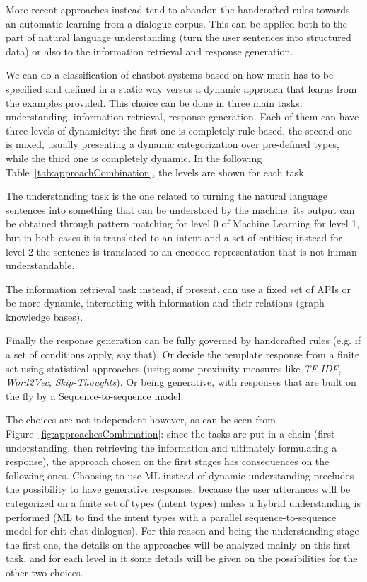 More recent approaches instead tend to abandon the handcrafted rules towards an automatic learning from a dialogue corpus. This can be applied both to the part of natural language understanding (turn the user sentences into structured data) or also to the information retrieval and response generation.

We can do a classification of chatbot systems based on how much has to be specified and defined in a static way versus a dynamic approach that learns from the examples provided. This choice can be done in three main tasks: understanding, information retrieval, response generation. Each of them can have three levels of dynamicity: the first one is completely rule-based, the second one is mixed, usually presenting a dynamic categorization over pre-defined types, while the third one is completely dynamic. In the following Table~\ref{tab:approachCombination}, the levels are shown for each task.



The understanding task is the one related to turning the natural language sentences into something that can be understood by the machine: its output can be obtained through pattern matching for level 0 of Machine Learning for level 1, but in both cases it is translated to an intent and a set of entities; instead for level 2 the sentence is translated to an encoded representation that is not human-understandable. 

The information retrieval task instead, if present, can use a fixed set of APIs or be more dynamic, interacting with information and their relations (graph knowledge bases).

Finally the response generation can be fully governed by handcrafted rules (e.g. if a set of conditions apply, say that). Or decide the template response from a finite set using statistical approaches (using some proximity measures like \textit{TF-IDF}, \textit{Word2Vec}, \textit{Skip-Thoughts}). Or being generative, with responses that are built on the fly by a Sequence-to-sequence model.

The choices are not independent however, as can be seen from Figure~\ref{fig:approachesCombination}: since the tasks are put in a chain (first understanding, then retrieving the information and ultimately formulating a response), the approach chosen on the first stages has consequences on the following ones. Choosing to use ML instead of dynamic understanding precludes the possibility to have generative responses, because the user utterances will be categorized on a finite set of types (intent types) unless a hybrid understanding is performed (ML to find the intent types with a parallel sequence-to-sequence model for chit-chat dialogues). For this reason and being the understanding stage the first one, the details on the approaches will be analyzed mainly on this first task, and for each level in it some details will be given on the possibilities for the other two choices.

